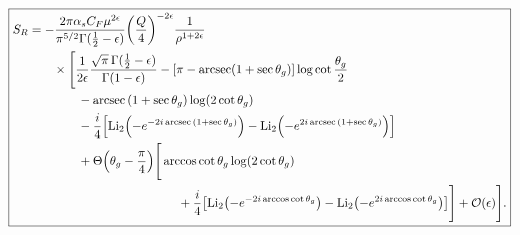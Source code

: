 \documentclass[11pt,twoside,reqno]{amsart}
\theoremstyle{plain}
\theoremstyle{remark}
\theoremstyle{definition}
\theoremstyle{remark}
\theoremstyle{definition}
\theoremstyle{definition}
\newcommand{\cO}{\mathcal{O}}
\newcommand{\Li}{\mathrm{Li}}
\begin{document}
	\begin{equation}\label{eq:full soft function}
	\boxed{
	\begin{aligned}
		S_R &= -\frac{2\pi\alpha_s C_F\mu^{2\epsilon}}{\pi^{5/2} \Gamma(\frac{1}{2} - \epsilon)}\qty(\frac{Q}{4})^{-2\epsilon} \frac{1}{\rho^{1 + 2\epsilon}} \\
			&\qquad\times \Bigg[\frac{1}{2\epsilon}\frac{\sqrt{\pi} \, \Gamma(\frac{1}{2} - \epsilon)}{\Gamma(1 - \epsilon)} - \qty[\pi - \arcsec(1 + \sec\theta_g)]\log\cot\frac{\theta_g}{2} \\
			&\qquad\qquad - \arcsec\qty(1 + \sec\theta_g) \log(2\cot\theta_g) \\
			&\qquad\qquad - \frac{i}{4}\qty[\Li_2\qty(-e^{-2i\arcsec\qty(1 + \sec\theta_g)}) - \Li_2\qty(-e^{2i\arcsec\qty(1 + \sec\theta_g)})] \\
			&\qquad\qquad+ \Theta\qty(\theta_g - \frac{\pi}{4})\Bigg[ \arccos\cot\theta_g \log(2\cot\theta_g) \\
			&\hspace{4.25cm}+ \frac{i}{4}\qty[\Li_2\qty(-e^{-2i\arccos\cot\theta_g}) - \Li_2\qty(-e^{2i\arccos\cot\theta_g})] \Bigg] + \cO(\epsilon) \Bigg].
	\end{aligned}
	}
	\end{equation}
\end{document}
